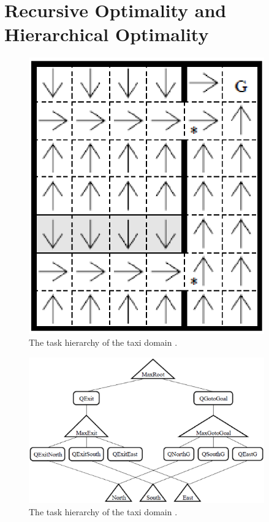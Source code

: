 
\section{Recursive Optimality and Hierarchical Optimality}
\begin{figure}[t]
\begin{center}
    \includegraphics[width=4in] {./figures/Maze.eps}
\end{center}
\caption{The task hierarchy of the taxi domain \cite{MaxQJ}.}
\label{fig:taxi}
\end{figure}
\begin{figure}[t]
\begin{center}
    \includegraphics[width=4in] {./figures/MazeH.eps}
\end{center}
\caption{The task hierarchy of the taxi domain \cite{MaxQJ}.}
\label{fig:taxi}
\end{figure}

